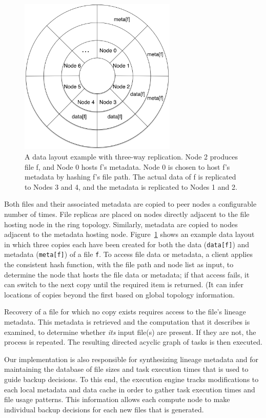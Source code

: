 \documentclass{sig-alternate}
\begin{document}
\begin{figure}[ht]
	\begin{center}
		\includegraphics[width=75mm]{pictures/datalayout}
		\caption{A data layout example with three-way replication. Node 2 produces file f, and Node 0 hosts f's
		metadata. Node 0 is chosen to host f's metadata by hashing f's file path. The actual data of f is replicated to Nodes 3 and 4, and the metadata is replicated
		to Nodes 1 and 2.
		\label{fig:datalayout}}
  	\end{center}
\end{figure}

Both files and their associated metadata are copied to peer nodes a configurable number of times.
File replicas are placed on nodes directly adjacent to the file hosting node in the ring topology.
Similarly, metadata are copied to nodes adjacent to the metadata hosting node.
Figure~\ref{fig:datalayout} shows an example data layout in which three copies each have been
created for both the data ({\tt data[f]}) and metadata ({\tt meta[f]}) of a file {\tt f}.
To access file data or metadata, a client applies the consistent hash function, with the file path and node list as input, to determine the node that hosts the file data or metadata; if that access fails, it can switch to the next copy until the required item is returned. (It can infer locations of copies beyond the first based on global topology information.

Recovery of a file for which no copy exists requires access to the file's lineage metadata.
This metadata is retrieved and the computation that it describes is examined, to
determine whether {\em its} input file(s) are present. If they are not, the process is repeated.
The resulting directed acyclic graph of tasks is then executed.

Our implementation is also responsible for synthesizing lineage metadata and for
maintaining the database of file sizes and task execution times that is
used to guide backup decisions. To this end, the execution engine tracks modifications to each
local metadata and data cache in order to gather task execution times and file usage patterns.
This information allows each compute node to make individual backup decisions for each new
files that is generated.
\end{document}
